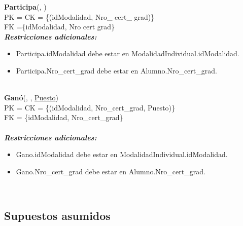 \noindent
\textbf{Participa}(, )\\
PK = CK = \{(idModalidad, Nro\_ cert\_ grad)\}\\
FK =\{idModalidad, Nro cert grad\}\\
\textbf{\textit{Restricciones adicionales:}}
\begin{itemize}
    \item Participa.idModalidad debe estar en ModalidadIndividual.idModalidad.
    \item Participa.Nro\_cert\_grad debe estar en Alumno.Nro\_cert\_grad.
\end{itemize}\\

\noindent
\textbf{Ganó}(, , \underline{Puesto})\\
PK = CK = \{(idModalidad, Nro\_cert\_grad, Puesto)\}\\
FK = \{idModalidad, Nro\_cert\_grad\}\\\\
\textbf{\textit{Restricciones adicionales:}}
\begin{itemize}
    \item Gano.idModalidad debe estar en ModalidadIndividual.idModalidad.
    \item Gano.Nro\_cert\_grad debe estar en Alumno.Nro\_cert\_grad.
\end{itemize}\\

\newpage
\subsection{Supuestos asumidos}
